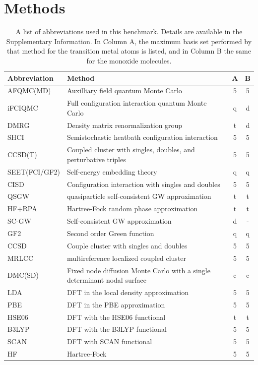\section{Methods} 

\begin{table}
\caption{A list of abbreviations used in this benchmark.
Details are available in the Supplementary Information.
In Column A, the maximum basis set performed by that method for the transition metal atoms is listed, and in Column B the same for the monoxide 
molecules. }\label{table:abbreviations}
\begin{tabular} {l|p{}|c|c}
Abbreviation & Method & A & B \\
\hline
AFQMC(MD) & Auxilliary field quantum Monte Carlo\cite{ShiweiPhaseless,Mario-WIRES-2018} & 5 & 5\\
iFCIQMC & Full configuration interaction quantum Monte Carlo & q & d\\
DMRG & Density matrix renormalization group & t & d \\
SHCI & Semistochastic heatbath configuration interaction & 5 &5 \\
CCSD(T) & Coupled cluster with singles, doubles, and perturbative triples\cite{bartlett_coupled-cluster_2007} & 5 & 5 \\
SEET(FCI/GF2) & Self-energy embedding theory & q & q \\
CISD & Configuration interaction with singles and doubles & 5 & 5 \\
QSGW & quasiparticle self-consistent GW approximation & t & t \\
HF+RPA & Hartree-Fock random phase approximation &t & t \\
SC-GW & Self-consistent GW approximation & d & - \\
GF2 & Second order Green function & q & q \\
CCSD & Couple cluster with singles and doubles\cite{bartlett_coupled-cluster_2007} & 5 &5 \\
MRLCC & multireference localized coupled cluster &5 & 5\\ 
DMC(SD)& Fixed node diffusion Monte Carlo with a single determinant nodal surface\cite{foulkes_quantum_2001,wagner_qwalk:_2009} & c & c\\
LDA & DFT in the local density approximation & 5 & 5\\
PBE & DFT in the PBE approximation &5 & 5  \\
HSE06 & DFT with the HSE06 functional &t & t\\
B3LYP & DFT with the B3LYP functional &5 & 5\\
SCAN & DFT with SCAN functional & 5 & 5\\
HF & Hartree-Fock & 5 & 5\\
    \end{tabular}
\end{table}

